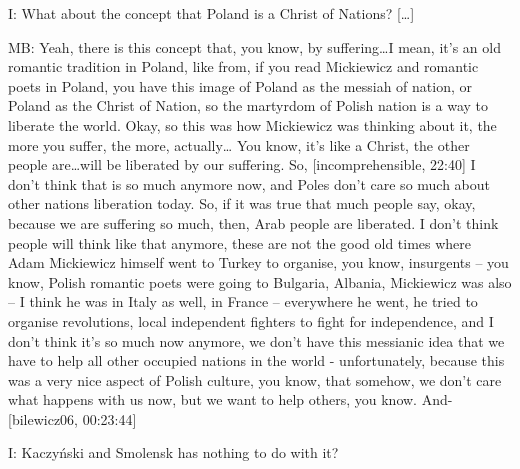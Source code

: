 I: What about the concept that Poland is a Christ of Nations? […] 

MB: Yeah, there is this concept that, you know, by suffering…I mean, it’s an old romantic tradition in Poland, like from, if you read Mickiewicz and romantic poets in Poland, you have this image of Poland as the messiah of nation, or Poland as the Christ of Nation, so the martyrdom of Polish nation is a way to liberate the world. Okay, so this was how Mickiewicz was thinking about it, the more you suffer, the more, actually… You know, it’s like a Christ, the other people are…will be liberated by our suffering. So, [incomprehensible, 22:40] I don’t think that is so much anymore now, and Poles don’t care so much about other nations liberation today. So, if it was true that much people say, okay, because we are suffering so much, then, Arab people are liberated. I don’t think people will think like that anymore, these are not the good old times where Adam Mickiewicz himself went to Turkey to organise, you know, insurgents – you know, Polish romantic poets were going to Bulgaria, Albania, Mickiewicz was also – I think he was in Italy as well, in France – everywhere he went, he tried to organise revolutions, local independent fighters to fight for independence, and I don’t think it’s so much now anymore, we don’t have this messianic idea that we have to help all other occupied nations in the world - unfortunately, because this was a very nice aspect of Polish culture, you know, that somehow, we don’t care what happens with us now, but we want to help others, you know. And- [bilewicz06, 00:23:44] 

I: Kaczyński and Smolensk has nothing to do with it? 

